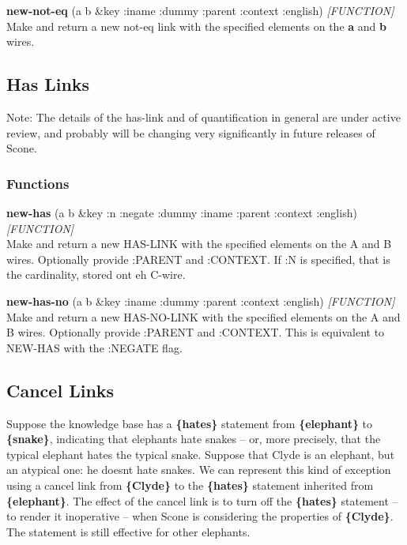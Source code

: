 \documentclass[titlepage,twoside,openright,11pt]{article}
\begin{document}
\textbf{new-not-eq} (a b \&key :iname :dummy :parent :context :english)
\emph{{[}FUNCTION{]}}\\
Make and return a new not-eq link with the specified elements on the
\textbf{a} and \textbf{b} wires.

\subsection{Has Links}\label{has-links}

Note: The details of the has-link and of quantification in general are
under active review, and probably will be changing very significantly in
future releases of Scone.

\subsubsection{Functions}\label{functions-6}

\textbf{new-has} (a b \&key :n :negate :dummy :iname :parent :context
:english) \emph{{[}FUNCTION{]}}\\
Make and return a new HAS-LINK with the specified elements on the A and
B wires. Optionally provide :PARENT and :CONTEXT. If :N is specified,
that is the cardinality, stored ont eh C-wire.

\textbf{new-has-no} (a b \&key :iname :dummy :parent :context :english)
\emph{{[}FUNCTION{]}}\\
Make and return a new HAS-NO-LINK with the specified elements on the A
and B wires. Optionally provide :PARENT and :CONTEXT. This is equivalent
to NEW-HAS with the :NEGATE flag.

\subsection{Cancel Links}\label{cancel-links}

Suppose the knowledge base has a \textbf{\{hates\}} statement from
\textbf{\{elephant\}} to \textbf{\{snake\}}, indicating that elephants
hate snakes -- or, more precisely, that the typical elephant hates the
typical snake. Suppose that Clyde is an elephant, but an atypical one:
he doesn\textquotesingle t hate snakes. We can represent this kind of
exception using a cancel link from \textbf{\{Clyde\}} to the
\textbf{\{hates\}} statement inherited from \textbf{\{elephant\}}. The
effect of the cancel link is to turn off the \textbf{\{hates\}}
statement -- to render it inoperative -- when Scone is considering the
properties of \textbf{\{Clyde\}}. The statement is still effective for
other elephants.
\end{document}
